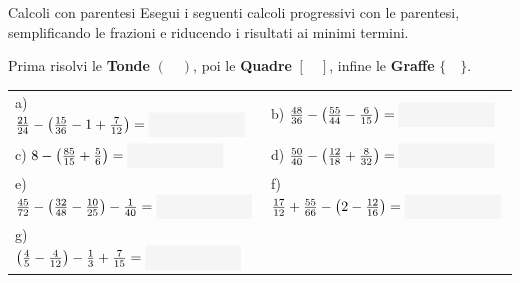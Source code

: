 \condnewpage

\begin{esercizio}{Calcoli con parentesi}
Esegui i seguenti calcoli progressivi con le parentesi, semplificando le frazioni e riducendo i risultati ai minimi termini.

\vspace{0.15cm}
\begin{tcolorbox}[
  colback=blue!3,
  colframe=mainblue,
  title={Ordine delle parentesi},
  fonttitle=\bfseries\small,
  arc=1.5mm,
  boxrule=0.8pt,
  left=2mm, right=2mm, top=1.5mm, bottom=1.5mm
]
\centering\small
Prima risolvi le \textbf{Tonde} $\mathbf{(\quad)}$, poi le \textbf{Quadre} $\mathbf{[\quad]}$, infine le \textbf{Graffe} $\mathbf{\{\quad\}}$.
\end{tcolorbox}
\vspace{0.2cm}

\renewcommand{\arraystretch}{2.5}
\begin{tabularx}{\linewidth}{XX}
  a) $\frac{21}{24} - \left(\frac{15}{36} - 1 + \frac{7}{12}\right) = \fillbox{2.2cm}$ & b) $\frac{48}{36} - \left(\frac{55}{44} - \frac{6}{15}\right) = \fillbox{2.2cm}$ \\
  c) $8 - \left(\frac{85}{15} + \frac{5}{6}\right) = \fillbox{2.2cm}$ & d) $\frac{50}{40} - \left(\frac{12}{18} + \frac{8}{32}\right) = \fillbox{2.2cm}$ \\
  e) $\frac{45}{72} - \left(\frac{32}{48} - \frac{10}{25}\right) - \frac{1}{40} = \fillbox{2.2cm}$ & f) $\frac{17}{12} + \frac{55}{66} - \left(2 - \frac{12}{16}\right) = \fillbox{2.2cm}$ \\
  g) $\left(\frac{4}{5} - \frac{4}{12}\right) - \frac{1}{3} + \frac{7}{15} = \fillbox{2.2cm}$ & \\
\end{tabularx}
\vspace{0.2cm}

\responsespace{3.8cm}


\end{esercizio}
